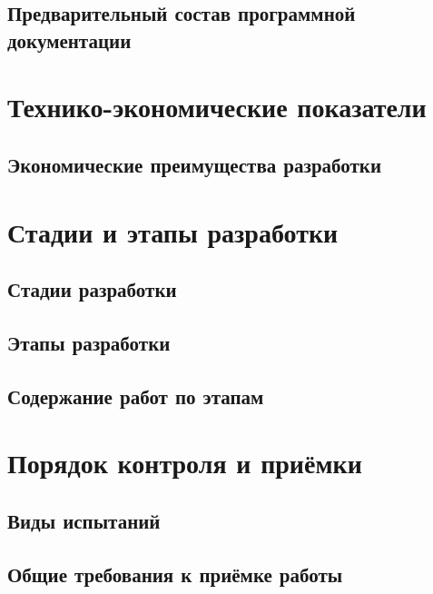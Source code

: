 \documentclass[a4paper,10pt]{article}
\begin{document}
\subsection{Предварительный состав программной документации}
\section{Технико-экономические показатели}
\subsection{Экономические преимущества разработки}
\section{Стадии и этапы разработки}
\subsection{Стадии разработки}
\subsection{Этапы разработки}
\subsection{Содержание работ по этапам}
\section{Порядок контроля и приёмки}
\subsection{Виды испытаний}
\subsection{Общие требования к приёмке работы}
\end{document}
